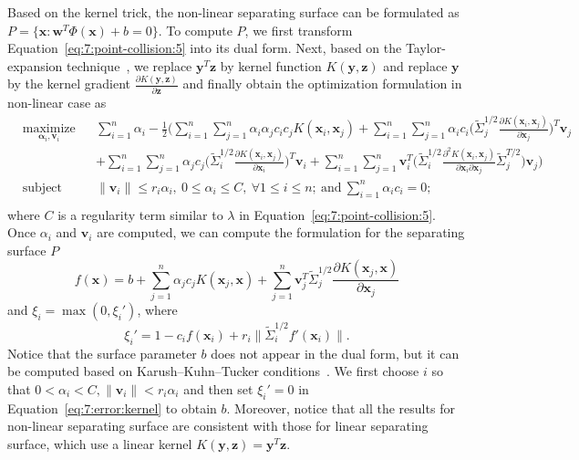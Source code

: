 Based on the kernel trick, the non-linear separating surface can be formulated as $P = \{\mathbf x: \mathbf w^T \Phi(\mathbf x) + b = 0\}$. To compute $P$,
we first transform Equation~\ref{eq:7:point-collision:5} into its dual form. Next, based on the Taylor-expansion technique~\cite{Bi:2005}, we replace $\mathbf y^T \mathbf z$ by kernel function $K(\mathbf y, \mathbf z)$ and
replace $\mathbf y$ by the kernel gradient $\frac{\partial K(\mathbf y, \mathbf z)}{\partial \mathbf z}$ and finally obtain the optimization formulation in non-linear case as
\begin{equation}
\label{eq:7:point-collision:6}
\begin{aligned}
	& \underset{\mathbf \alpha_i, \mathbf v_i}{\text{maximize}}
	& & \sum_{i=1}^n \alpha_i - \frac{1}{2}\Big( \sum_{i=1}^n \sum_{j=1}^n \alpha_i \alpha_j c_i c_j K(\mathbf x_i, \mathbf x_j) + \sum_{i=1}^n \sum_{j=1}^n \alpha_i c_i \big( \widetilde{\Sigma}_j^{1/2} \frac{\partial K(\mathbf x_i, \mathbf x_j)}{\partial \mathbf x_j}\big)^T \mathbf v_j  \\
    & & &  + \sum_{i=1}^n \sum_{j=1}^n \alpha_j c_j \big( \widetilde{\Sigma}_i^{1/2} \frac{\partial K(\mathbf x_i, \mathbf x_j)}{\partial \mathbf x_i}\big)^T \mathbf v_i + \sum_{i=1}^n \sum_{j=1}^n \mathbf v_i^T \big( \widetilde{\Sigma}_i^{1/2} \frac{\partial^2 K(\mathbf x_i, \mathbf x_j)}{\partial \mathbf x_i \partial \mathbf x_j} \widetilde{\Sigma}_j^{T/2}\big) \mathbf v_j \Big) \\
	& \text{subject to}
	& & \|\mathbf v_i\| \leq r_i \alpha_i, \ 0 \leq \alpha_i \leq C, \ \forall 1 \leq i \leq n; \ \text{and} \ \sum_{i=1}^n \alpha_i c_i = 0;  \\
	\end{aligned}
	\end{equation}
where $C$ is a regularity term similar to $\lambda$ in Equation~\ref{eq:7:point-collision:5}. Once $\alpha_i$ and $\mathbf v_i$ are computed, we can compute
the formulation for the separating surface $P$
\begin{equation}
f(\mathbf x) = b + \sum_{j=1}^n \alpha_j c_j K(\mathbf x_j, \mathbf x) + \sum_{j=1}^n \mathbf v_j^T \widetilde{\Sigma}_j^{1/2} \frac{\partial K(\mathbf x_j, \mathbf x)}{\partial \mathbf x_j}
\end{equation}
and $\xi_i = \max(0, \xi_i')$, where
\begin{equation}
\label{eq:7:error:kernel}
\xi_i' = 1 - c_i f(\mathbf x_i) + r_i \|\widetilde{\Sigma}_i^{1/2} f'(\mathbf x_i)\|.
\end{equation}
Notice that the surface parameter $b$ does not appear in the dual form, but it can be computed based on Karush--Kuhn--Tucker conditions~\cite{CC01a}.
We first choose $i$ so that $0 < \alpha_i < C, \|\mathbf v_i \| < r_i \alpha_i$ and then set $\xi_i' = 0$ in Equation~\ref{eq:7:error:kernel} to obtain $b$.
Moreover, notice that all the results for non-linear separating surface are consistent with those for linear separating surface, which use a
linear kernel $K(\mathbf y, \mathbf z) = \mathbf y^T \mathbf z$.



